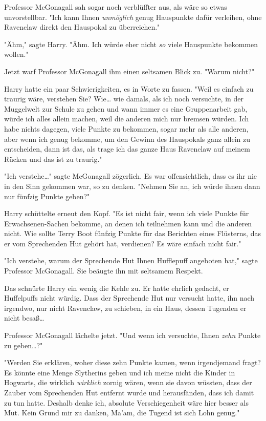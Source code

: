 {Professor McGonagall sah sogar noch verblüffter aus, als wäre so etwas unvorstellbar. "Ich kann Ihnen \emph{unmöglich} genug Hauspunkte dafür verleihen, ohne Ravenclaw direkt den Hauspokal zu überreichen."

"Ähm," sagte Harry. "Ähm. Ich würde eher nicht \emph{so} viele Hauspunkte bekommen wollen."

Jetzt warf Professor McGonagall ihm einen seltsamen Blick zu. "Warum nicht?"

Harry hatte ein paar Schwierigkeiten, es in Worte zu fassen. "Weil es einfach zu traurig wäre, verstehen Sie? Wie… wie damals, als ich noch versuchte, in der Muggelwelt zur Schule zu gehen und wann immer es eine Gruppenarbeit gab, würde ich alles allein machen, weil die anderen mich nur bremsen würden. Ich habe nichts dagegen, viele Punkte zu bekommen, sogar mehr als alle anderen, aber wenn ich genug bekomme, um den Gewinn des Hauspokals ganz allein zu entscheiden, dann ist das, als trage ich das ganze Haus Ravenclaw auf meinem Rücken und das ist zu traurig."

"Ich verstehe…" sagte McGonagall zögerlich. Es war offensichtlich, dass es ihr nie in den Sinn gekommen war, so zu denken. "Nehmen Sie an, ich würde ihnen dann nur fünfzig Punkte geben?"

Harry schüttelte erneut den Kopf. "Es ist nicht fair, wenn ich viele Punkte für Erwachsenen-Sachen bekomme, an denen ich teilnehmen kann und die anderen nicht. Wie sollte Terry Boot fünfzig Punkte für das Berichten eines Flüsterns, das er vom Sprechenden Hut gehört hat, verdienen? Es wäre einfach nicht fair."

"Ich verstehe, warum der Sprechende Hut Ihnen Hufflepuff angeboten hat," sagte Professor McGonagall. Sie beäugte ihn mit seltsamem Respekt.

Das schnürte Harry ein wenig die Kehle zu. Er hatte ehrlich gedacht, er Huffelpuffs nicht würdig. Dass der Sprechende Hut nur versucht hatte, ihn nach irgendwo, nur nicht Ravenclaw, zu schieben, in ein Haus, dessen Tugenden er nicht besaß…

Professor McGonagall lächelte jetzt. "Und wenn ich versuchte, Ihnen \emph{zehn} Punkte zu geben…?"

"Werden Sie erklären, woher diese zehn Punkte kamen, wenn irgendjemand fragt? Es könnte eine Menge Slytherins geben und ich meine nicht die Kinder in Hogwarts, die wirklich \emph{wirklich} zornig wären, wenn sie davon wüssten, dass der Zauber vom Sprechenden Hut entfernt wurde und herausfänden, dass ich damit zu tun hatte. Deshalb denke ich, absolute Verschiegenheit wäre hier besser als Mut. Kein Grund mir zu danken, Ma'am, die Tugend ist sich Lohn genug."

}
